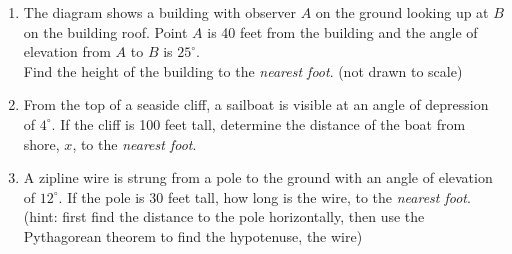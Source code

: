 \documentclass[12pt, twoside]{article}
\begin{document}
\begin{enumerate}
\item The diagram shows a building with observer $A$ on the ground looking up at $B$ on the building roof. Point $A$ is 40 feet from the building and the angle of elevation from $A$ to $B$ is $25^\circ$.\\[0.25cm]
Find the height of the building to the \emph{nearest foot}. \hfill (not drawn to scale)
  \begin{flushright}
    \end{flushright}
    
\newpage
\item From the top of a seaside cliff, a sailboat is visible at an angle of depression of $4^\circ$. If the cliff is 100 feet tall, determine the distance of the boat from shore, $x$, to the \emph{nearest foot}.
\begin{center}
  \end{center} \vspace{3.25cm}

\item A zipline wire is strung from a pole to the ground with an angle of elevation of $12^\circ$. If the pole is 30 feet tall, how long is the wire, to the \emph{nearest foot}. \\[0.25cm]
(hint: first find the distance to the pole horizontally, then use the Pythagorean theorem to find the hypotenuse, the wire)\\[0.25cm]
   \vspace{4cm}

\end{enumerate}
\end{document}
